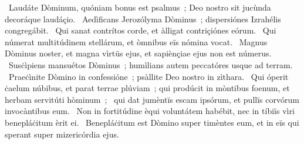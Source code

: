 \psalmChapterWithInscription{}
{ }
{%
~Laudáte Dòminum, quóniam bonus est psalmus~; Deo nostro sit jucùnda decoráque laudáçio. 
~Aedìficans Jerozólyma Dòminus~; dispersiónes Izrahélis congregábit. 
~Qui sanat contrítos corde, et àlligat contriçiónes eórum. 
~Qui númerat multitúdinem stellárum, et òmnibus eïs nómina vocat. 
~Magnus Dòminus noster, et magna vìrtüs ejus, et sapiènçiae ejus non est númerus. 
~Susċìpiens mansuétos Dòminus~; humìlians autem peccatóres usque ad terram. 
~Praeċìnite Dòmino in confessióne~; psàllite Deo nostro in zìthara. 
~Qui óperit ċaelum núbibus, et parat terrae plúviam~; qui prodúcit in mòntibus foenum, et herbam servitúti hòminum~; 
~qui dat jumèntïs escam ipsórum, et pullïs corvórum invocàntibus eum. 
~Non in fortitúdine èqui voluntátem habébit, nec in tíbiïs vìri benepláċitum èrit ei. 
~Benepláċitum est Dòmino super timèntes eum, et in eïs qui sperant super mizericórdia ejus. 
}
